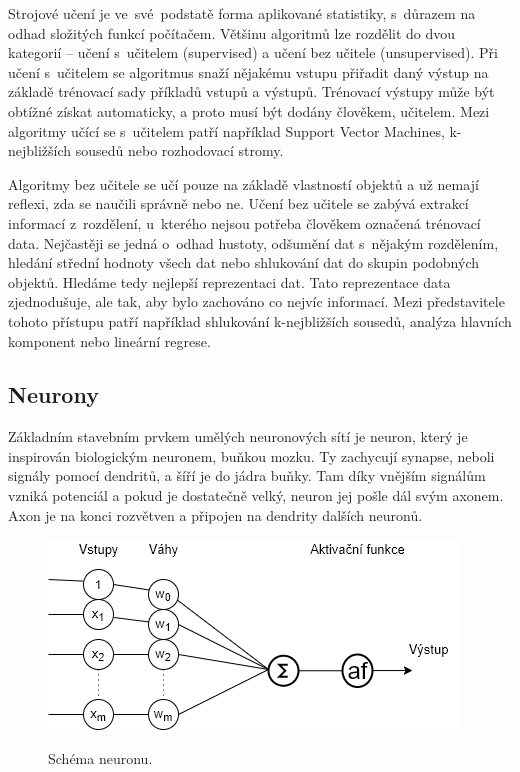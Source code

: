 Strojové učení je ve~své~podstatě forma aplikované statistiky,
s~důrazem na odhad složitých funkcí počítačem.
Většinu algoritmů lze rozdělit do dvou kategorií --
učení s~učitelem (supervised) 
a učení bez učitele (unsupervised).
Při učení s~učitelem se algoritmus snaží nějakému vstupu přiřadit daný výstup
na základě trénovací sady příkladů vstupů a výstupů.
Trénovací výstupy může být obtížné získat automaticky,
a proto musí být dodány člověkem, učitelem.
Mezi algoritmy učící se s~učitelem patří například Support Vector Machines,
k-nejbližších sousedů nebo rozhodovací stromy.
\par

Algoritmy bez učitele se učí pouze na základě vlastností objektů 
a už nemají reflexi, zda se naučili správně nebo ne.
Učení bez učitele se zabývá extrakcí informací z~rozdělení,
u~kterého nejsou potřeba člověkem označená trénovací data.
Nejčastěji se jedná o~odhad hustoty, 
odšumění dat s~nějakým rozdělením,
hledání střední hodnoty všech dat 
nebo shlukování dat do skupin podobných objektů.
Hledáme tedy nejlepší reprezentaci dat.
Tato reprezentace data zjednodušuje, ale tak, 
aby bylo zachováno co nejvíc informací.
Mezi představitele tohoto přístupu patří například 
shlukování k-nejbližších sousedů, 
analýza hlavních komponent nebo lineární regrese. 

\subsection*{Neurony}
Základním stavebním prvkem umělých neuronových sítí je neuron,
který je inspirován biologickým neuronem, buňkou mozku.
Ty zachycují synapse, neboli signály pomocí dendritů, 
a šíří je do jádra buňky.
Tam díky vnějším signálům vzniká potenciál 
a pokud je dostatečně velký, 
neuron jej pošle dál svým axonem.
Axon je na konci rozvětven 
a připojen na dendrity dalších neuronů.

\begin{figure}[h]\centering
    \centering
    \includegraphics[width=0.6\linewidth]{obrazky/neuronSchema.png}\\[1pt]  
    \caption{Schéma neuronu.}    
    \label{obrazekSchemaNeuronu}
\end{figure}

